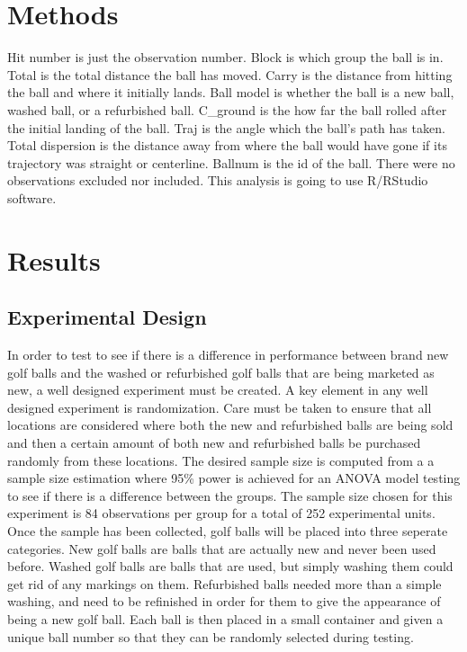 \documentclass{article}\usepackage[]{graphicx}\usepackage[]{color}
\begin{document}
\section*{Methods}

Hit number is just the observation number. Block is which group the ball is in. Total is the total distance the ball has moved. Carry is the distance from hitting the ball and where it initially lands. Ball model is whether the ball is a new ball, washed ball, or a refurbished ball. C\_ground is the how far the ball rolled after the initial landing of the ball. Traj is the angle which the ball's path has taken. Total dispersion is the distance away from where the ball would have gone if its trajectory was straight or centerline. Ballnum is the id of the ball. 
There were no observations excluded nor included. This analysis is going to use R/RStudio software.

\section*{Results}
\subsection*{Experimental Design}


In order to test to see if there is a difference in performance between brand new golf balls and the washed or refurbished golf balls that are being marketed as new, a well designed experiment must be created. A key element in any well designed experiment is randomization. Care must be taken to ensure that all locations are considered where both the new and refurbished balls are being sold and then a certain amount of both new and refurbished balls be purchased randomly from these locations. The desired sample size is computed from a a sample size estimation where 95\% power is achieved for an ANOVA model testing to see if there is a difference between the groups. The sample size chosen for this experiment is 84 observations per group for a total of 252 experimental units. Once the sample has been collected, golf balls will be placed into three seperate categories. New golf balls are balls that are actually new and never been used before. Washed golf balls are balls that are used, but simply washing them could get rid of any markings on them. Refurbished balls needed more than a simple washing, and need to be refinished in order for them to give the appearance of being a new golf ball. Each ball is then placed in a small container and given a unique ball number so that they can be randomly selected during testing.
\end{document}
